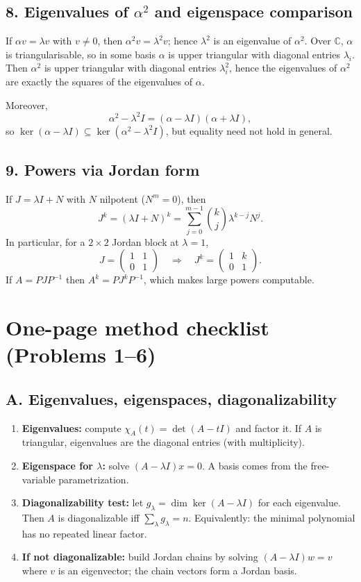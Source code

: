\documentclass[12pt,a4paper]{article}
\theoremstyle{plain}
\theoremstyle{definition}      %
\begin{document}
\subsection*{8. Eigenvalues of $\alpha^2$ and eigenspace comparison}
If $\alpha v=\lambda v$ with $v\neq 0$, then $\alpha^2v=\lambda^2v$; hence $\lambda^2$ is an eigenvalue of $\alpha^2$.
Over $\mathbb C$, $\alpha$ is triangularisable, so in some basis $\alpha$ is upper triangular with diagonal entries $\lambda_i$.
Then $\alpha^2$ is upper triangular with diagonal entries $\lambda_i^2$, hence the eigenvalues of $\alpha^2$ are exactly the squares of the eigenvalues of $\alpha$.

Moreover,
\[
\alpha^2-\lambda^2 I=(\alpha-\lambda I)(\alpha+\lambda I),
\]
so $\ker(\alpha-\lambda I)\subseteq \ker(\alpha^2-\lambda^2 I)$, but equality need not hold in general.

\subsection*{9. Powers via Jordan form}
If $J=\lambda I+N$ with $N$ nilpotent ($N^m=0$), then
\[
J^k=(\lambda I+N)^k=\sum_{j=0}^{m-1}\binom{k}{j}\lambda^{k-j}N^j.
\]
In particular, for a $2\times 2$ Jordan block at $\lambda=1$,
\[
J=\begin{pmatrix}1&1\\0&1\end{pmatrix}
\quad\Rightarrow\quad
J^k=\begin{pmatrix}1&k\\0&1\end{pmatrix}.
\]
If $A=PJP^{-1}$ then $A^k=PJ^kP^{-1}$, which makes large powers computable.

\section*{One-page method checklist (Problems 1--6)}

\subsection*{A. Eigenvalues, eigenspaces, diagonalizability}
\begin{enumerate}
	\item \textbf{Eigenvalues:} compute $\chi_A(t)=\det(A-tI)$ and factor it.
	If $A$ is triangular, eigenvalues are the diagonal entries (with multiplicity).
	\item \textbf{Eigenspace for $\lambda$:} solve $(A-\lambda I)x=0$.
	A basis comes from the free-variable parametrization.
	\item \textbf{Diagonalizability test:}
	let $g_\lambda=\dim\ker(A-\lambda I)$ for each eigenvalue.
	Then $A$ is diagonalizable iff $\sum_\lambda g_\lambda=n$.
	Equivalently: the minimal polynomial has no repeated linear factor.
	\item \textbf{If not diagonalizable:} build Jordan chains by solving
	$(A-\lambda I)w=v$ where $v$ is an eigenvector; the chain vectors form a Jordan basis.
\end{enumerate}
\end{document}
